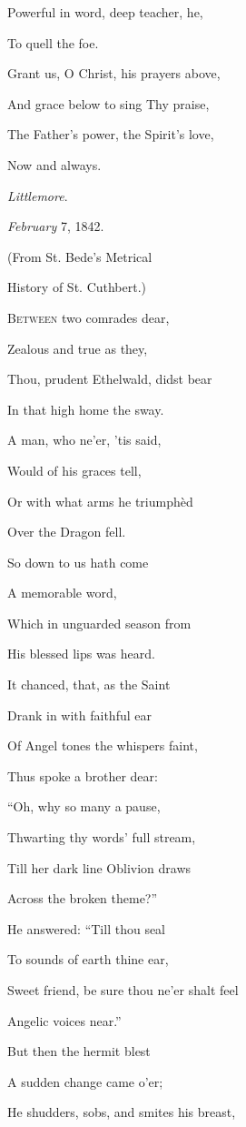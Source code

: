 Powerful in word, deep teacher, he,

To quell the foe.

Grant us, O Christ, his prayers above,

And grace below to sing Thy praise,

The Father's power, the Spirit's love,

Now and always.

\emph{Littlemore}.

\emph{February} 7, 1842.


(From St. Bede's Metrical

History of St.
Cuthbert.)

B\textsc{etween} two comrades dear,

Zealous and true as
they,

Thou, prudent Ethelwald, didst bear

In that high home the
sway.

A man, who ne'er, 'tis said,

Would of his graces
tell,

Or with what arms he triumphèd

Over the Dragon fell.

So down to us hath come

A memorable word,

Which in unguarded season from

His blessed lips was
heard. 

It chanced, that, as the Saint

Drank in with
faithful ear

Of Angel tones the whispers faint,

Thus spoke a
brother dear:

``Oh, why so many a pause,

Thwarting thy words'
full stream,

Till her dark line Oblivion draws

Across the broken
theme?''

He answered: ``Till thou seal

To sounds of earth
thine ear,

Sweet friend, be sure thou ne'er shalt feel

Angelic voices
near.''

But then the hermit blest

A sudden change
came o'er;

He shudders, sobs, and smites his breast,

